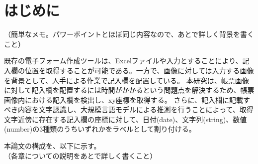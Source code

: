 \chapter{はじめに}\label{cha:Introduction}
（簡単なメモ。パワーポイントとほぼ同じ内容なので、あとで詳しく背景を書くこと）

既存の電子フォーム作成ツールは、Excelファイルや入力とすることにより、記入欄の位置を取得することが可能である。一方で、画像に対しては入力する画像を背景として、人手による作業で記入欄を配置している。
本研究は、帳票画像に対して記入欄を配置するには時間がかかるという問題点を解決するため、帳票画像内における記入欄を検出し、xy座標を取得する。
さらに、記入欄に記載すべき内容を文字認識し、大規模言語モデルによる推測を行うことによって、取得文字近傍に存在する記入欄の座標に対して、日付(date)、文字列(string)、数値(number)の3種類のうちいずれかをラベルとして割り付ける。

本論文の構成を、以下に示す。\\
  （各章についての説明をあとで詳しく書くこと）
